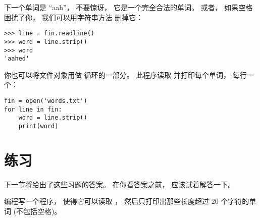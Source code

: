 
下一个单词是 ``aah''， 不要惊讶， 它是一个完全合法的单词。
或者， 如果空格困扰了你， 我们可以用字符串方法  删掉它：
  
  


\begin{lstlisting}
>>> line = fin.readline()
>>> word = line.strip()
>>> word
'aahed'
\end{lstlisting}


你也可以将文件对象用做  循环的一部分。
此程序读取  并打印每个单词， 每行一个：
  

\begin{lstlisting}
fin = open('words.txt')
for line in fin:
    word = line.strip()
    print(word)
\end{lstlisting}

%
\section{练习}


\hyperref[search]{下一节}将给出了这些习题的答案。
在你看答案之前， 应该试着解答一下。

\begin{exercise}

编程写一个程序， 使得它可以读取 {\em {}} ， 然后只打印出那些长度超过 20 个字符的单词 (不包括空格)。

\end{exercise}

